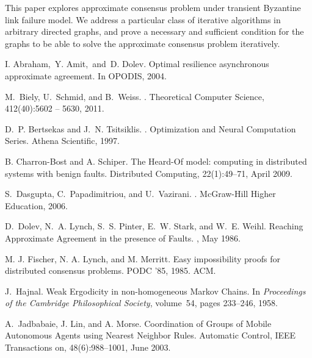 \documentclass{llncs}
\begin{document}
This paper explores approximate consensus problem under transient Byzantine link failure model. We address a particular class of iterative algorithms in arbitrary directed graphs, and prove a necessary and sufficient condition for the graphs to be able to solve the approximate consensus problem iteratively.





\begin{thebibliography}{10}
I. Abraham,~Y. Amit,~and~D. Dolev. 
\newblock Optimal resilience asynchronous approximate agreement. 
\newblock In OPODIS, 2004.



M.~Biely, U.~Schmid, and B.~Weiss. 
. \newblock Theoretical Computer Science, 412(40):5602 – 5630, 2011.

D.~P. Bertsekas and J.~N. Tsitsiklis.
.
\newblock Optimization and Neural Computation Series. Athena Scientific, 1997.

B. Charron-Bost and A. Schiper. 
\newblock The Heard-Of model: computing in distributed systems with benign faults.
\newblock Distributed Computing, 22(1):49–71, April 2009.

S.~Dasgupta, C.~Papadimitriou, and U.~Vazirani.
.
\newblock McGraw-Hill Higher Education, 2006.

D.~Dolev, N.~A. Lynch, S.~S. Pinter, E.~W. Stark, and W.~E. Weihl.
\newblock Reaching Approximate Agreement in the presence of Faults.
, May 1986.

M. J. Fischer, N. A. Lynch, and M. Merritt. 
\newblock Easy impossibility proofs for distributed consensus problems.
\newblock PODC '85, 1985. ACM.

J.~Hajnal.
\newblock Weak Ergodicity in non-homogeneous Markov Chains.
\newblock In {\em Proceedings of the Cambridge Philosophical Society},
  volume~54, pages 233--246, 1958.

A.~Jadbabaie, J. Lin, and A. Morse. 
\newblock Coordination of Groups of Mobile Autonomous Agents using Nearest Neighbor Rules. 
\newblock Automatic Control, IEEE Transactions on, 48(6):988--1001, June 2003.



\end{thebibliography}
\end{document}
